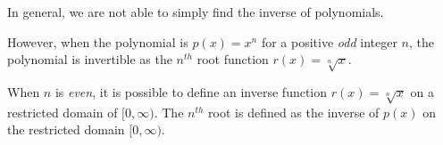 \documentclass{ximera}
\begin{document}
%
%
%
%

%
%

\begin{summary}
In general, we are not able to simply find the inverse of polynomials.

However, when the polynomial is $p(x) = x^n$ for a positive {\em odd} integer $n$, the polynomial is invertible as the $n^{th}$ root function $r(x) = \sqrt[n]{x}$.

When $n$ is {\em even}, it is possible to define an inverse function $r(x) = \sqrt[n]{x}$ on a restricted domain of $[0, \infty)$. The $n^{th}$ root is defined as the inverse of $p(x)$ on the restricted domain $[0,\infty)$.
\end{summary}
\end{document}
